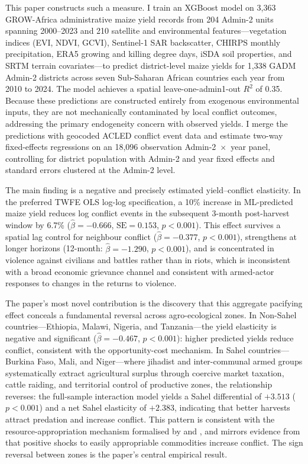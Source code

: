This paper constructs such a measure. I train an XGBoost model on 3,363 GROW-Africa administrative maize yield records from 204 Admin-2 units spanning 2000--2023 and 210 satellite and environmental features---vegetation indices (EVI, NDVI, GCVI), Sentinel-1 SAR backscatter, CHIRPS monthly precipitation, ERA5 growing and killing degree days, iSDA soil properties, and SRTM terrain covariates---to predict district-level maize yields for 1,338 GADM Admin-2 districts across seven Sub-Saharan African countries each year from 2010 to 2024. The model achieves a spatial leave-one-admin1-out $R^2$ of 0.35. Because these predictions are constructed entirely from exogenous environmental inputs, they are not mechanically contaminated by local conflict outcomes, addressing the primary endogeneity concern with observed yields. I merge the predictions with geocoded ACLED conflict event data and estimate two-way fixed-effects regressions on an 18,096 observation Admin-2~$\times$~year panel, controlling for district population with Admin-2 and year fixed effects and standard errors clustered at the Admin-2 level.

The main finding is a negative and precisely estimated yield--conflict elasticity. In the preferred TWFE OLS log-log specification, a 10\% increase in ML-predicted maize yield reduces log conflict events in the subsequent 3-month post-harvest window by 6.7\% ($\hat{\beta} = -0.666$, $\text{SE} = 0.153$, $p < 0.001$). This effect survives a spatial lag control for neighbour conflict ($\hat{\beta} = -0.377$, $p < 0.001$), strengthens at longer horizons (12-month: $\hat{\beta} = -1.290$, $p < 0.001$), and is concentrated in violence against civilians and battles rather than in riots, which is inconsistent with a broad economic grievance channel and consistent with armed-actor responses to changes in the returns to violence.

The paper's most novel contribution is the discovery that this aggregate pacifying effect conceals a fundamental reversal across agro-ecological zones. In Non-Sahel countries---Ethiopia, Malawi, Nigeria, and Tanzania---the yield elasticity is negative and significant ($\hat{\beta} = -0.467$, $p < 0.001$): higher predicted yields reduce conflict, consistent with the opportunity-cost mechanism. In Sahel countries---Burkina Faso, Mali, and Niger---where jihadist and inter-communal armed groups systematically extract agricultural surplus through coercive market taxation, cattle raiding, and territorial control of productive zones, the relationship reverses: the full-sample interaction model yields a Sahel differential of $+3.513$ ($p < 0.001$) and a net Sahel elasticity of $+2.383$, indicating that better harvests attract predation and increase conflict. This pattern is consistent with the resource-appropriation mechanism formalised by \citet{Grossman1991} and \citet{DalBoDalBo2011}, and mirrors evidence from \citet{DubeVargas2013} that positive shocks to easily appropriable commodities increase conflict. The sign reversal between zones is the paper's central empirical result.

